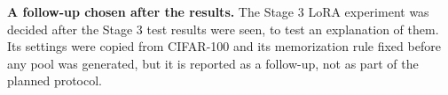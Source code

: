 \textbf{A follow-up chosen after the results.} The Stage 3 LoRA experiment was decided after the Stage 3 test results were seen, to test an explanation of them. Its settings were copied from CIFAR-100 and its memorization rule fixed before any pool was generated, but it is reported as a follow-up, not as part of the planned protocol.
